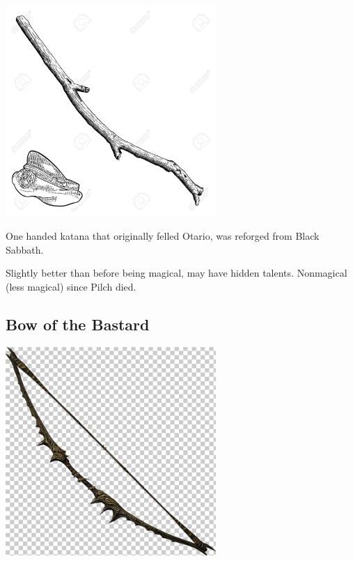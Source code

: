 \begin{center}
\includegraphics[width=80mm]{./content/img/xxx.png}
\begin{figure}[h]
\end{figure}
\end{center}

\noindent 

One handed katana that originally felled Otario, was reforged from Black Sabbath.

Slightly better than before being magical, may have hidden talents. Nonmagical (less magical) since Pilch died.

\smallskip

\subsection*{Bow of the Bastard} 

\begin{center}
\includegraphics[width=80mm]{./content/img/bastardBow.jpg}
\begin{figure}[h]
\end{figure}
\end{center}

